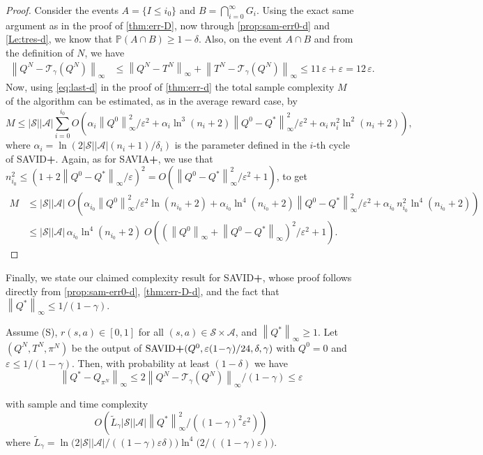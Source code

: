 \documentclass{article}
\newcommand{\cA}{\mathcal{A}}
\newcommand{\cS}{\mathcal{S}}
\newcommand{\prob}{\mathbb{P}}
\newcommand{\T}{\mathcal{T}}
\newcommand*{\infn}[1]{\left\|{#1}\right\|_{\infty}}
\newenvironment{manualtheorem}[1]{%
    \renewcommand\themanualtheoreminner{#1}%
  \manualtheoreminner
}{\endmanualtheoreminner}
\theoremstyle{plain}
\theoremstyle{definition}
\theoremstyle{remark}
\begin{document}
\begin{proof}
Consider the events $A=\{I\leq i_0\}$ and $B=\bigcap_{i=0}^\infty G_i$. Using the exact same argument as in the proof of \cref{thm:err-D}, now through \cref{prop:sam-err0-d} and \cref{Le:tres-d}, we know that $\prob(A\cap B)\geq 1-\delta$. Also, on the event $A\cap B$ and from the definition of $N$, we have
\begin{align*}
    \infn{Q^N-\T_\gamma(Q^N)}&\leq \infn{Q^N-T^N}+\infn{T^N-\T_\gamma(Q^N)}\leq 11\,\varepsilon+\varepsilon=12\,\varepsilon.
\end{align*} 
Now, using \eqref{eq:last-d} in the proof of \cref{thm:err-d}
the total sample complexity $M$ of the algorithm can be estimated, as in the average reward case, by
$$M\leq |\cS||\cA|\sum^{i_0}_{i=0}O\!\left(\alpha_i \infn{Q^0}^2/\varepsilon^{2}+ \mbox{$\alpha_i\ln^3(n_i+2)\infn{Q^0-Q^*}^2/\varepsilon^{2}+\alpha_i\,n_i^2\ln^2(n_i+2)$}\right),$$
where $\alpha_i= \ln(2|\cS||\cA|(n_i\!+\!1)/\delta_i)$ is the parameter defined in the $i$-th cycle of \mbox{\rm SAVID\textbf{+}}. Again, as for \mbox{\rm SAVIA\textbf{+}}, we use that $n_{i_0}^2 \leq (1+2\infn{Q^0-Q^{*}}/\varepsilon)^2=O(\infn{Q^0-Q^*}^2/\varepsilon^2 + 1)$, to get 
$$
\begin{aligned}
M &\leq |\cS||\cA| \;  O\!\left(\alpha_{i_0} \infn{Q^0}^2/\varepsilon^{2} \ln(n_{i_0}\!+2)+ \mbox{$\alpha_{i_0}\ln^4(n_{i_0}\!+2)\infn{Q^0-Q^*}^2/\varepsilon^{2}+\alpha_{i_0}\,n_{i_0}^2\ln^4(n_{i_0}\!+2)$}\right)\\
&\leq |\cS||\cA|\, \alpha_{i_0}\ln^4(n_{i_0}\!+2)\; O\!\left( (\infn{Q^0}+\infn{Q^0-Q^*})^2/\varepsilon^{2}+1\right).
\end{aligned}
$$
\end{proof}
Finally, we state our claimed complexity result for \mbox{\rm SAVID\textbf{+}}, whose proof follows directly from \cref{prop:sam-err0-d}, \cref{thm:err-D-d}, and the fact that $\infn{Q^*} \le 1/(1\!-\!\gamma)$.
\begin{manualtheorem}{\ref{cor:err2-d}}
Assume \mbox{\sc (S)}, $  r(s,a) \in [0,1]$ for all $(s,a)\in \cS\times \cA$, and $\infn{Q^*} \ge 1$. Let $(Q^N,T^N,\pi^N)$ be the output of $ \mbox{\rm SAVID\textbf{+}}(Q^0,\varepsilon(1\!-\!\gamma)/24,\delta, \gamma)$ with $Q^0=0$ and $\varepsilon \le 1/(1\!-\!\gamma)$. Then, with probability at least $(1-\delta)$ we have
\vspace{-1ex}
  $$ \infn{Q^*-Q_{\pi^N}}\leq 2\infn{Q^N-\T_\gamma(Q^N)}/(1\!-\!\gamma) \leq \varepsilon$$
 
  \vspace{-2ex}
   with sample and time complexity $${O\!}\left(\widetilde{L}_{\gamma}|\cS||\cA|\infn{Q^*}^{2}/((1\!-\!\gamma)^2\varepsilon^{2})\right)$$
   where $\widetilde{L}_{\gamma}= \ln \big(2|\cS||\cA|/((1\!-\!\gamma)\varepsilon \delta)\big)\ln^4 \big(2/((1\!-\!\gamma)\varepsilon)\big)$.
\end{manualtheorem}
\end{document}
